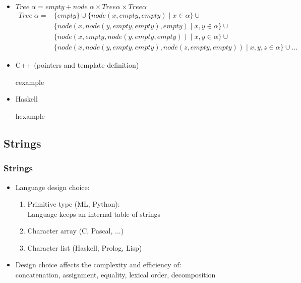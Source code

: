 \begin{frame}
 \begin{itemize}[<+->]
  \item $Tree\;\alpha = empty + node\;\alpha\times Tree \alpha \times Tree \alpha$
{\scriptsize
\[\begin{array}{ll}
Tree\;\alpha= & \{empty\} \cup \{node(x,empty,empty) \mid x \in \alpha\} \cup \\
     & \{node(x,node(y,empty,empty),empty) \mid x,y \in \alpha \} \cup \\
     & \{node(x,empty,node(y,empty,empty)) \mid x,y \in \alpha \} \cup \\
     & \{node(x,node(y,empty,empty),node(z,empty,empty)) \mid x,y,z \in \alpha \} \cup ...
  \end{array}
\]
}
\item C++ (pointers and template definition)
\begin{beamercolorbox}{cexample}
 \codeagacC
\end{beamercolorbox}

\item Haskell
\begin{beamercolorbox}{hexample}
 \codeagacH
\end{beamercolorbox}
 \end{itemize}
\end{frame}

\subsection{Strings}
\begin{frame}
\frametitle{Strings}
\begin{itemize}[<+->]
\item Language design choice:
\begin{enumerate}[<+->]
\item Primitive type (ML, Python): \\
	Language keeps an internal table of strings
\item Character array (C, Pascal, ...)
\item Character list (Haskell, Prolog, Lisp)
\end{enumerate}
 \item Design choice affects the complexity and efficiency of:\\
  concatenation, assignment, equality, lexical order, decomposition
\end{itemize}
 \end{frame}

